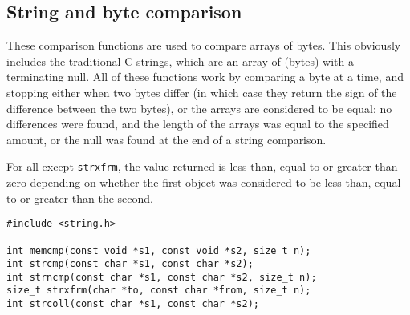   

  \subsection{String and byte comparison}
   

   These comparison functions are used to compare arrays of bytes.  This
    obviously includes the traditional C strings, which are an array of
    \kchar{} (bytes) with a terminating null.  All of these functions
    work by comparing a byte at a time, and stopping either when two bytes
    differ (in which case they return the sign of the difference between the
    two bytes), or the arrays are considered to be equal: no differences were
    found, and the length of the arrays was equal to the specified amount, or
    the null was found at the end of a string comparison.


   For all except \texttt{strxfrm}, the value returned is less than,
    equal to or greater than zero depending on whether the first object was
    considered to be less than, equal to or greater than the second.


   \begin{Verbatim}
#include <string.h>

int memcmp(const void *s1, const void *s2, size_t n);
int strcmp(const char *s1, const char *s2);
int strncmp(const char *s1, const char *s2, size_t n);
size_t strxfrm(char *to, const char *from, size_t n); 
int strcoll(const char *s1, const char *s2);
\end{Verbatim}

